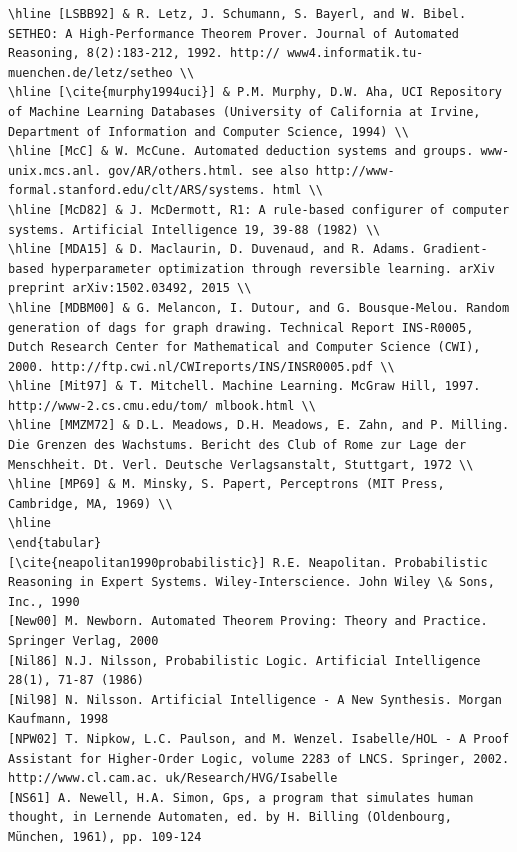 \documentclass[10pt]{article}
\begin{document}
\begin{verbatim}
\hline [LSBB92] & R. Letz, J. Schumann, S. Bayerl, and W. Bibel. SETHEO: A High-Performance Theorem Prover. Journal of Automated Reasoning, 8(2):183-212, 1992. http:// www4.informatik.tu-muenchen.de/letz/setheo \\
\hline [\cite{murphy1994uci}] & P.M. Murphy, D.W. Aha, UCI Repository of Machine Learning Databases (University of California at Irvine, Department of Information and Computer Science, 1994) \\
\hline [McC] & W. McCune. Automated deduction systems and groups. www-unix.mcs.anl. gov/AR/others.html. see also http://www-formal.stanford.edu/clt/ARS/systems. html \\
\hline [McD82] & J. McDermott, R1: A rule-based configurer of computer systems. Artificial Intelligence 19, 39-88 (1982) \\
\hline [MDA15] & D. Maclaurin, D. Duvenaud, and R. Adams. Gradient-based hyperparameter optimization through reversible learning. arXiv preprint arXiv:1502.03492, 2015 \\
\hline [MDBM00] & G. Melancon, I. Dutour, and G. Bousque-Melou. Random generation of dags for graph drawing. Technical Report INS-R0005, Dutch Research Center for Mathematical and Computer Science (CWI), 2000. http://ftp.cwi.nl/CWIreports/INS/INSR0005.pdf \\
\hline [Mit97] & T. Mitchell. Machine Learning. McGraw Hill, 1997. http://www-2.cs.cmu.edu/tom/ mlbook.html \\
\hline [MMZM72] & D.L. Meadows, D.H. Meadows, E. Zahn, and P. Milling. Die Grenzen des Wachstums. Bericht des Club of Rome zur Lage der Menschheit. Dt. Verl. Deutsche Verlagsanstalt, Stuttgart, 1972 \\
\hline [MP69] & M. Minsky, S. Papert, Perceptrons (MIT Press, Cambridge, MA, 1969) \\
\hline
\end{tabular}
[\cite{neapolitan1990probabilistic}] R.E. Neapolitan. Probabilistic Reasoning in Expert Systems. Wiley-Interscience. John Wiley \& Sons, Inc., 1990
[New00] M. Newborn. Automated Theorem Proving: Theory and Practice. Springer Verlag, 2000
[Nil86] N.J. Nilsson, Probabilistic Logic. Artificial Intelligence 28(1), 71-87 (1986)
[Nil98] N. Nilsson. Artificial Intelligence - A New Synthesis. Morgan Kaufmann, 1998
[NPW02] T. Nipkow, L.C. Paulson, and M. Wenzel. Isabelle/HOL - A Proof Assistant for Higher-Order Logic, volume 2283 of LNCS. Springer, 2002. http://www.cl.cam.ac. uk/Research/HVG/Isabelle
[NS61] A. Newell, H.A. Simon, Gps, a program that simulates human thought, in Lernende Automaten, ed. by H. Billing (Oldenbourg, München, 1961), pp. 109-124

\end{verbatim}
\end{document}
